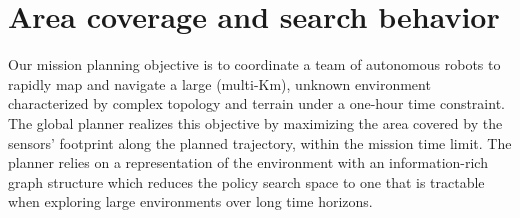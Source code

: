 \documentclass[letterpaper, 10pt, conference]{ieeeconf}      %
\newcommand{\ph}[1]{{\textbf{#1}:}} %
\newcommand{\todo}[1]{{\color{red} #1 }} %
\begin{document}








\section{Area coverage and search behavior}\label{sec:coverage}
Our mission planning objective %
is to coordinate a team of autonomous robots to rapidly map and navigate a large (multi-Km), unknown environment characterized by complex topology and terrain under a one-hour time constraint. The global planner realizes this objective by maximizing the area covered by the sensors' footprint along the planned trajectory, within the mission time limit. The planner relies on a representation of the environment with an information-rich graph structure which reduces the policy search space to one that is tractable when exploring large environments over long time horizons.
\end{document}
